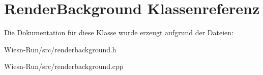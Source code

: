 \hypertarget{classRenderBackground}{\section{Render\-Background Klassenreferenz}
\label{classRenderBackground}
}


Die Dokumentation für diese Klasse wurde erzeugt aufgrund der Dateien\-:\begin{DoxyCompactItemize}
\item 
Wiesn-\/\-Run/src/renderbackground.\-h\item 
Wiesn-\/\-Run/src/renderbackground.\-cpp\end{DoxyCompactItemize}
